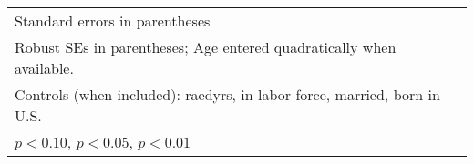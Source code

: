 \begin{table}[htbp]
{\begin{tabular}{l*{8}{c}}
\bottomrule
\multicolumn{9}{l}{\footnotesize Standard errors in parentheses}\\
\multicolumn{9}{l}{\footnotesize Robust SEs in parentheses; Age entered quadratically when available.}\\
\multicolumn{9}{l}{\footnotesize Controls (when included): raedyrs, in labor force, married, born in U.S.}\\
\multicolumn{9}{l}{\footnotesize \sym{*} \(p<0.10\), \sym{**} \(p<0.05\), \sym{***} \(p<0.01\)}\\
\end{tabular}
}%
\end{table}
